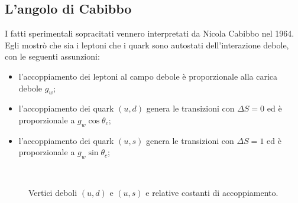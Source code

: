 \documentclass{subnucbo}
\begin{document}
\subsection{L'angolo di Cabibbo}
\label{subsec:cabibbo_angle}
I fatti sperimentali sopracitati vennero interpretati da Nicola Cabibbo nel 1964. Egli mostrò che sia i leptoni che i quark sono autostati dell'interazione debole, con le seguenti assunzioni:
\begin{itemize}
        \item l'accoppiamento dei leptoni al campo debole è proporzionale alla carica debole $g_{w}$;
        \item l'accoppiamento dei quark $(u, d)$ genera le transizioni con $\Delta S = 0$ ed è proporzionale a $g_{w}\cos\theta_{c}$;
        \item l'accoppiamento dei quark $(u, s)$ genera le transizioni con $\Delta S = 1$ ed è proporzionale a $g_{w}\sin\theta_{c}$;
\end{itemize}
\begin{figure}[!h]
        \centering
        \qquad
        \qquad
         \\
        \caption{Vertici deboli $(u,d)$ e $(u,s)$ e relative costanti di accoppiamento.}
        \label{fig:cabibbo_ud_us}
\end{figure}
\end{document}
